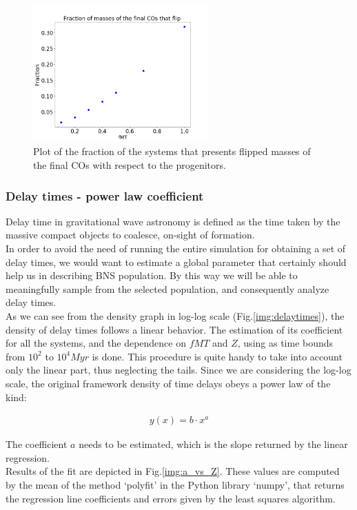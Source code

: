 \documentclass[preprint,12pt]{elsarticle}
\begin{document}
\begin{figure}[h!!]
    \centering
    \includegraphics[width=0.6\textwidth]{Images/flipmasses.png}
    \caption{Plot of the fraction of the systems that presents flipped masses of the final COs with respect to the progenitors.}
    \label{img:flipmasses}
\end{figure}

\subsubsection{\textbf{Delay times - power law coefficient}}
Delay time in gravitational wave astronomy is defined as the time taken by the massive compact objects to coalesce, on-sight of formation.\\
In order to avoid the need of running the entire simulation for obtaining a set of delay times, we would want to estimate a global parameter that certainly should help us in describing BNS population. By this way we will be able to meaningfully sample from the selected population, and consequently analyze delay times.\\  
As we can see from the density graph in log-log scale (Fig.\ref{img:delaytimes}), the density of delay times follows a linear behavior. The estimation of its coefficient for all the systems, and the dependence on $fMT$ and $Z$, using as time bounds from $10^2$ to $10^4 Myr$ is done. This procedure is quite handy to take into account only the linear part, thus neglecting the tails. Since we are considering the log-log scale, the original framework density of time delays obeys a power law of the kind:

\begin{align*}
    y(x) = b \cdot x^a
\end{align*}

The coefficient $a$ needs to be estimated, which is the slope returned by the linear regression.\\
Results of the fit are depicted in Fig.\ref{img:a_vs_Z}. These values are computed by the mean of the method `polyfit' in the Python library `numpy', that returns the regression line coefficients and errors given by the least squares algorithm. 
\end{document}
